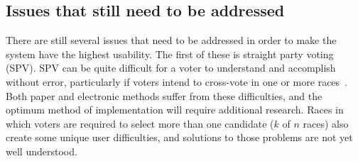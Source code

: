 \subsection{Issues that still need to be addressed}
There are still several issues that need to be addressed in order to make the system have the highest usability. The first of these is straight party voting (SPV). SPV can be quite difficult for a voter to understand and accomplish without error, particularly if voters intend to cross-vote in one or more races~\cite{campbell-ieee}. Both paper and electronic methods suffer from these difficulties, and the optimum method of implementation will require additional research. Races in which voters are required to select more than one candidate ($k$ of $n$ races) also create some unique user difficulties, and solutions to those problems are not yet well understood. 



